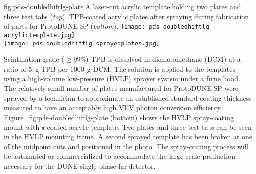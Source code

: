 \begin{dunefigure}
{fig:pds-doubledhiftlg-plate}
{A laser-cut acrylic template holding two plates and three test tabs ({\it top}). TPB-coated acrylic plates after spraying during fabrication of parts for ProtoDUNE-SP ({\it bottom}).}
    \texttt{[image: pds-doubledhiftlg-acrylictemplate.jpg]}\\
    \vspace{0.3cm}
    \texttt{[image: pds-doubledhiftlg-sprayedplates.jpg]}
\end{dunefigure}

Scintillation grade ($\ge 99$\%) TPB is dissolved in dichloromethane (DCM) at a ratio of \SI{5}{g} TPB per \SI{1000}{g} DCM. The solution is applied to the templates using a high-volume low-pressure (HVLP) sprayer system under a fume hood. The relatively small number of plates manufactured for ProtoDUNE-SP were sprayed by a technician to approximate an established standard coating thickness measured to have an acceptably high VUV photon conversion efficiency. Figure~\ref{fig:pds-doubledhiftlg-plate}(bottom) shows the HVLP spray-coating mount with a coated acrylic template. Two plates and three test tabs can be seen in the HVLP mounting frame. A second sprayed template has been broken at one of the midpoint cuts and positioned in the photo. The spray-coating process will be automated or commercialized to accommodate the large-scale production necessary for the DUNE single-phase far detector.

